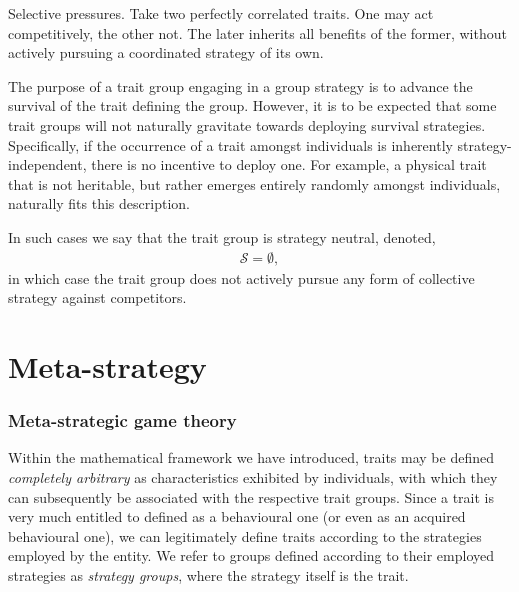 \documentclass[twocolumn, aps, rmp, amsmath, amssymb, nofootinbib, superscriptaddress, longbibliography, floatfix, table-of-contents, eqsecnum]{revtex4-1}
\begin{document}
Selective pressures. Take two perfectly correlated traits. One may act competitively, the other not. The later inherits all benefits of the former, without actively pursuing a coordinated strategy of its own.

The purpose of a trait group engaging in a group strategy is to advance the survival of the trait defining the group. However, it is to be expected that some trait groups will not naturally gravitate towards deploying survival strategies. Specifically, if the occurrence of a trait amongst individuals is inherently strategy-independent, there is no incentive to deploy one. For example, a physical trait that is not heritable, but rather emerges entirely randomly amongst individuals, naturally fits this description.

In such cases we say that the trait group is strategy neutral, denoted,
\begin{align}
	\mathcal{S}=\emptyset,
\end{align}
in which case the trait group does not actively pursue any form of collective strategy against competitors.

%
%

\part{Meta-strategy}

\section{Meta-strategic game theory}

Within the mathematical framework we have introduced, traits may be defined \textit{completely arbitrary} as characteristics exhibited by individuals, with which they can subsequently be associated with the respective trait groups. Since a trait is very much entitled to defined as a behavioural one (or even as an acquired behavioural one), we can legitimately define traits according to the strategies employed by the entity. We refer to groups defined according to their employed strategies as \textit{strategy groups}, where the strategy itself is the trait.
\end{document}
